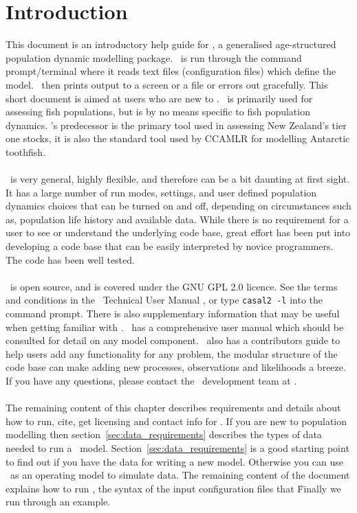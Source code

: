 \section{Introduction}\label{sec:introduction}

This document is an introductory help guide for \CNAME, a generalised age-structured population dynamic modelling package. \CNAME\ is run through the command prompt/terminal where it reads text files (configuration files) which define the model. \CNAME\ then prints output to a screen or a file or errors out gracefully. This short document is aimed at users who are new to \CNAME. \CNAME\ is primarily used for assessing fish populations, but is by no means specific to fish population dynamics. \CNAME's predecessor is the primary tool used in assessing New Zealand's tier one stocks, it is also the standard tool used by CCAMLR for modelling Antarctic toothfish. 
\\\\
\CNAME\ is very general, highly flexible, and therefore can be a bit daunting at first sight. 
It has a large number of run modes, settings, and user defined population dynamics choices that 
can be turned on and off, depending on circumstances such as, population life history and 
available data. While there is no requirement for a user to see or understand the underlying 
code base, great effort has been put into developing a code base that can be easily interpreted 
by novice programmers. The code has been well tested. 
\\\\
\CNAME\ is open source, and is covered under the GNU GPL 2.0 licence. See the terms and conditions in the \CNAME\ Technical User Manual \citep{CASAL2}, or type \texttt{casal2 -l} into the command prompt. There is also supplementary information that may be useful 
when getting familiar with \CNAME. \CNAME\ has a comprehensive user manual \citep{CASAL2} which should be consulted for 
detail on any model component. \CNAME\ also has a contributors guide to help users add any functionality for any problem, 
the modular structure of the code base can make adding new processes, observations and likelihoods a breeze. If you have any questions, please contact the \CNAME\ development team at \email.
\\\\
The remaining content of this chapter describes requirements and details about how to run, cite, get licensing and contact info for \CNAME. 
If you are new to population modelling then section~\ref{sec:data_requirements} describes the types of data needed to run a \CNAME\ model. Section~\ref{sec:data_requirements} is a good starting point to find out if you have the data for writing a new model. Otherwise you can use \CNAME\ as an operating model to simulate data. 
The remaining content of the document explains how to run \CNAME, the syntax of the input configuration files that \CNAME\. Finally we run through an example.
\\\\
